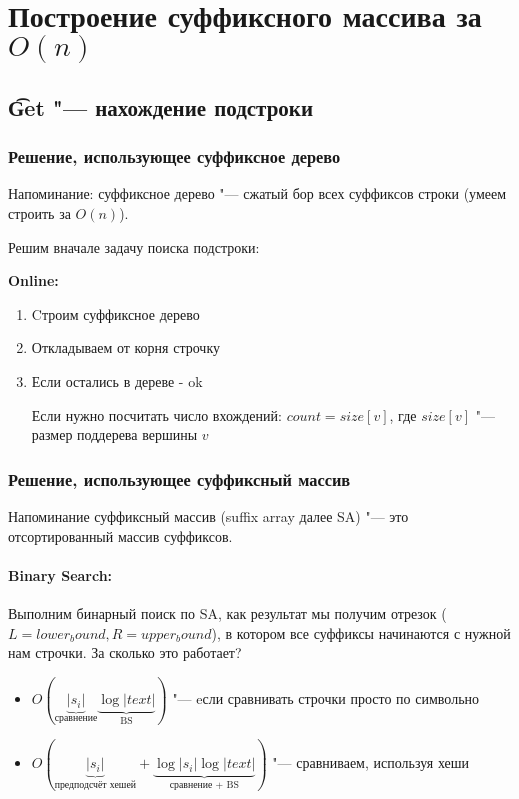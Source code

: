 \section{Построение суффиксного массива за \texorpdfstring{$O(n)$}{O(n)}}

\subsection{\t{Get} "--- нахождение подстроки}

\subsubsection{Решение, использующее суффиксное дерево}
Напоминание: суффиксное дерево "--- сжатый бор всех суффиксов строки (умеем строить за $O(n)$).

Решим вначале задачу поиска подстроки:

\textbf{Online:}
	\begin{enumerate}
	\item Cтроим суффиксное дерево
	\item Откладываем от корня строчку
	\item Если остались в дереве - ok
	
	Если нужно посчитать число вхождений: $count = size[v]$, где $size[v]$ "--- размер поддерева вершины $v$
	\end{enumerate}

\subsubsection{Решение, использующее суффиксный массив}

Напоминание суффиксный массив (suffix array далее SA) "--- это отсортированный массив суффиксов.

\paragraph{Binary Search:}

Выполним бинарный поиск по SA, как результат мы получим отрезок ($L = lower_bound, R = upper_bound$), в котором все суффиксы начинаются с нужной нам строчки.
За сколько это работает?
	\begin{itemize}
		\item $O(\underbrace{|s_i|}_{\text{сравнение}}\underbrace{\log |text|}_{\text{BS}})$ "--- eсли сравнивать строчки просто по символьно
		\item $O(\underbrace{|s_i|}_{\text{предподсчёт хешей}} + \underbrace{\log |s_i| \log |text|}_{\text{сравнение + BS}})$ "--- сравниваем, используя хеши
	\end{itemize}	 

